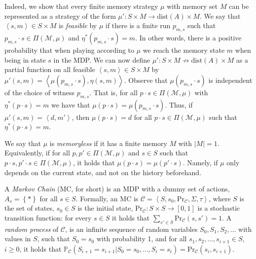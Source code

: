 \documentclass[10pt,a4paper]{amsart}
\theoremstyle{definition}
\numberwithin{equation}{section}
\newcommand{\set}[1]{\{ #1 \}}
\newcommand{\C}{{\mathcal C}}
\newcommand{\M}{{\mathcal M}}
\newcommand{\zug}[1]{\left\langle #1 \right\rangle}
\renewcommand{\set}[1]{\left\{ #1 \right\}}
\renewcommand{\P}{\mathbb{P}}
\renewcommand{\Pr}{\mathrm{Pr}}
\newcommand{\dist}{\mathrm{dist}}
\begin{document}
Indeed, we show that every finite memory strategy $\mu$ with memory set $M$ can be represented as a strategy of the form $\mu':S\times M \rightarrow \dist(A)\times M$. We say that $\zug{s,m}\in S\times M$ is \emph{feasible} by $\mu$ if there is a finite run $p_{m,s}$ such that $p_{m,s}\cdot s\in \Pi(\M,\mu)$ and $\eta^*(p_{m,s}\cdot s)=m$. In other words, there is a positive probability that when playing according to $\mu$ we reach the memory state $m$ when being in state $s$ in the MDP. We can now define $\mu': S\times M\nrightarrow \dist(A)\times M$ as a partial function on all feasible $\zug{s, m}\in S\times M$ by $\mu'(s,m)=\zug{\mu(p_{m,s}\cdot s),\eta(s,m)}$.  Observe that $\mu(p_{m,s}\cdot s)$ is independent of the choice of witness $p_{m,s}$. That is, for all $p\cdot s\in \Pi(\M,\mu)$ with $\eta^*(p\cdot s)=m$ we have that $\mu(p\cdot s)=\mu(p_{m,s}\cdot s)$. Thus, if $\mu'(s,m)=\zug{d,m'}$, then $\mu(p\cdot s)=d$ for all $p\cdot s\in \Pi(\M,\mu)$ such that $\eta^*(p\cdot s)=m$.

We say that $\mu$ is \emph{memoryless} if it has a finite memory $M$ with $|M|=1$. Equivalently, if for all $p,p'\in \Pi(\M,\mu)$ and $s\in S$ such that $p\cdot s,p'\cdot s\in \Pi(\M,\mu)$, it holds that $\mu(p\cdot s)=\mu(p'\cdot s)$. Namely, if $\mu$ only depends on the current state, and not on the history beforehand.


A \emph{Markov Chain} (MC, for short) is an MDP with a dummy set of actions, $A_s=\set{\ast}$ for all $s\in S$. Formally, an MC is $\C=\zug{S,s_0,\Pr_\C,\Sigma,\tau}$, where $S$ is the set of states, $s_0\in S$ is the initial state, $\Pr_\C:S\times S\rightarrow[0,1]$ is a stochastic transition function: for every $s\in S$ it holds that $\sum_{s'\in S}\Pr_\C(s,s')=1$. A \emph{random process} of $\C$, is an infinite sequence of random variables $S_0,S_1,S_2,\ldots$ with values in $S$, such that $S_0=s_0$ with probability 1, and for all $s_1,s_2,\ldots,s_{i+1}\in S$, $i\geq 0$, it holds that $\P_\C(S_{i+1}=s_{i+1}|S_0 = s_0,\ldots,S_i=s_i)=\Pr_\C(s_i,s_{i+1})$.  
\end{document}

